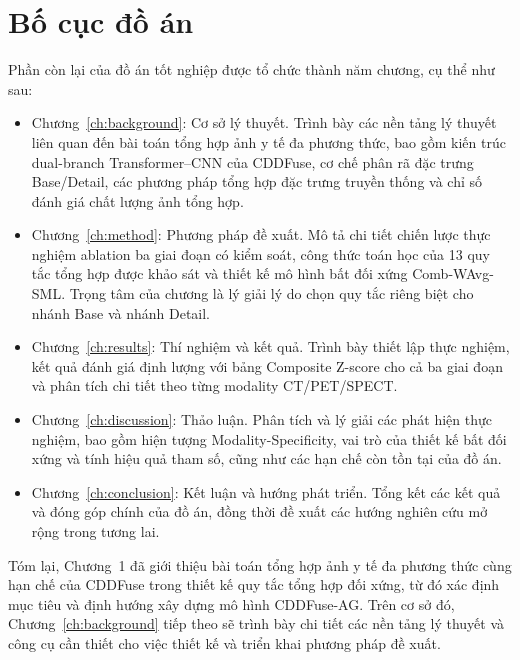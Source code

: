 \section{Bố cục đồ án}
\label{sec:outline}

Phần còn lại của đồ án tốt nghiệp được tổ chức thành năm chương, cụ thể như sau:

\begin{itemize}\itemsep4pt
    \item Chương~\ref{ch:background}: Cơ sở lý thuyết. Trình bày các nền tảng lý thuyết liên quan đến bài toán tổng hợp ảnh y tế đa phương thức, bao gồm kiến trúc dual-branch Transformer--CNN của CDDFuse, cơ chế phân rã đặc trưng Base/Detail, các phương pháp tổng hợp đặc trưng truyền thống và chỉ số đánh giá chất lượng ảnh tổng hợp.

    \item Chương~\ref{ch:method}: Phương pháp đề xuất. Mô tả chi tiết chiến lược thực nghiệm ablation ba giai đoạn có kiểm soát, công thức toán học của 13 quy tắc tổng hợp được khảo sát và thiết kế mô hình bất đối xứng Comb-WAvg-SML. Trọng tâm của chương là lý giải lý do chọn quy tắc riêng biệt cho nhánh Base và nhánh Detail.

    \item Chương~\ref{ch:results}: Thí nghiệm và kết quả. Trình bày thiết lập thực nghiệm, kết quả đánh giá định lượng với bảng Composite Z-score cho cả ba giai đoạn và phân tích chi tiết theo từng modality CT/PET/SPECT.

    \item Chương~\ref{ch:discussion}: Thảo luận. Phân tích và lý giải các phát hiện thực nghiệm, bao gồm hiện tượng Modality-Specificity, vai trò của thiết kế bất đối xứng và tính hiệu quả tham số, cũng như các hạn chế còn tồn tại của đồ án.

    \item Chương~\ref{ch:conclusion}: Kết luận và hướng phát triển. Tổng kết các kết quả và đóng góp chính của đồ án, đồng thời đề xuất các hướng nghiên cứu mở rộng trong tương lai.
\end{itemize}

Tóm lại, Chương~1 đã giới thiệu bài toán tổng hợp ảnh y tế đa phương thức cùng hạn chế của CDDFuse trong thiết kế quy tắc tổng hợp đối xứng, từ đó xác định mục tiêu và định hướng xây dựng mô hình CDDFuse-AG. Trên cơ sở đó, Chương~\ref{ch:background} tiếp theo sẽ trình bày chi tiết các nền tảng lý thuyết và công cụ cần thiết cho việc thiết kế và triển khai phương pháp đề xuất.
